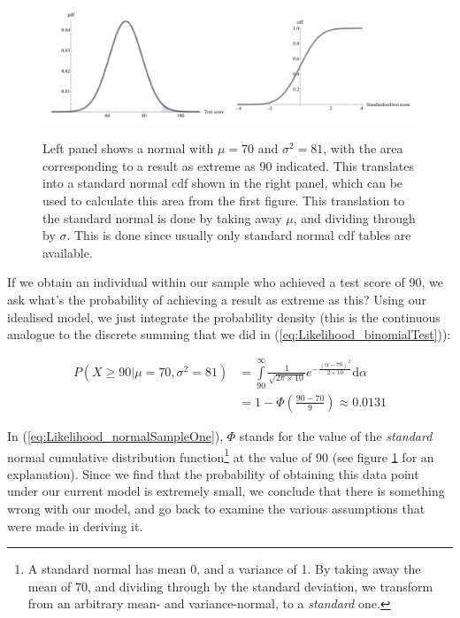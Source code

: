 \documentclass[11pt,fullpage]{book}
\begin{document}
\begin{figure}
\centering
\scalebox{0.35} 
{\includegraphics{likelihood_normal.pdf}}
\caption{Left panel shows a normal with $\mu=70$ and $\sigma^2 = 81$, with the area corresponding to a result as extreme as 90 indicated. This translates into a standard normal cdf shown in the right panel, which can be used to calculate this area from the first figure. This translation to the standard normal is done by taking away $\mu$, and dividing through by $\sigma$. This is done since usually only standard normal cdf tables are available.}\label{fig:Likelihood_normal}
\end{figure}

If we obtain an individual within our sample who achieved a test score of 90, we ask what's the probability of achieving a result as extreme as this? Using our idealised model, we just integrate the probability density (this is the continuous analogue to the discrete summing that we did in (\ref{eq:Likelihood_binomialTest})):

\begin{equation}
\begin{align}
P(X\geq 90|\mu=70,\sigma^2=81) &= \int\limits_{90}^{\infty}\frac{1}{\sqrt{2\pi\times 10}}e^{-\frac{(\alpha-70)^2}{2\times 10}} \mathrm{d}\alpha\\
 & = 1-\Phi\left(\frac{90-70}{9}\right) \approx 0.0131
\end{align}\label{eq:Likelihood_normalSampleOne}
\end{equation}

In (\ref{eq:Likelihood_normalSampleOne}), $\Phi$ stands for the value of the \textit{standard} normal cumulative distribution function\footnote{A standard normal has mean 0, and a variance of 1. By taking away the mean of 70, and dividing through by the standard deviation, we transform from an arbitrary mean- and variance-normal, to a \textit{standard} one.} at the value of 90 (see figure \ref{fig:Likelihood_normal} for an explanation). Since we find that the probability of obtaining this data point under our current model is extremely small, we conclude that there is something wrong with our model, and go back to examine the various assumptions that were made in deriving it.
\end{document}
